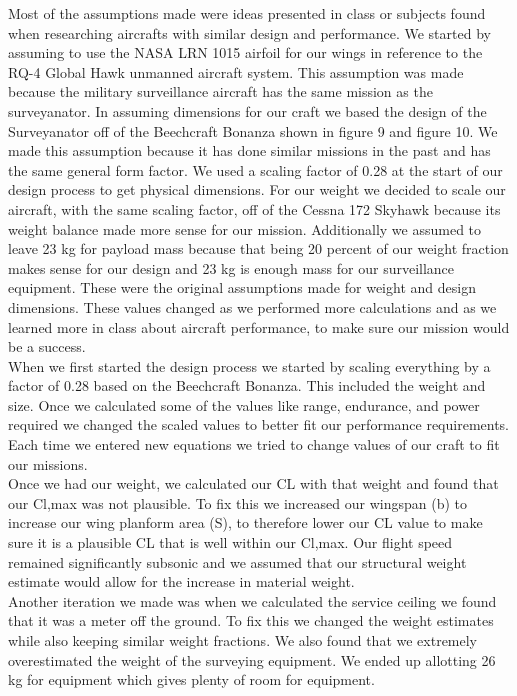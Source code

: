 \documentclass[12pt,A4paper]{article}
\begin{document}
	\hspace{.15 in} Most of the assumptions made were ideas presented in class or subjects found when researching aircrafts with similar design and performance. We started by assuming to use the NASA LRN 1015 airfoil for our wings in reference to the RQ-4 Global Hawk unmanned aircraft system. This assumption was made because the military surveillance aircraft has the same mission as the surveyanator. In assuming dimensions for our craft we based the design of the Surveyanator off of the Beechcraft Bonanza shown in figure 9 and figure 10. We made this assumption because it has done similar missions in the past and has the same general form factor. We used a scaling factor of 0.28 at the start of our design process to get physical dimensions. For our weight we decided to scale our aircraft, with the same scaling factor, off of the Cessna 172 Skyhawk because its weight balance made more sense for our mission. Additionally we assumed to leave 23 kg for payload mass because that being 20 percent of our weight fraction makes   sense for our design and 23 kg is enough mass for our surveillance equipment. These were the original assumptions made for weight and design dimensions. These values changed as we performed more calculations and as we learned more in class about aircraft performance, to make sure our mission would be a success. \\
	\indent When we first started the design process we started by scaling everything by a factor of 0.28 based on the Beechcraft Bonanza. This included the weight and size. Once we calculated some of the values like range, endurance, and power required we changed the scaled values to better fit our performance requirements. Each time we entered new equations we tried to change values of our craft to fit our missions. \\
	\indent Once we had our weight, we calculated our CL with that weight and found that our Cl,max was not plausible. To fix this we increased our wingspan (b) to increase our wing planform area (S), to therefore lower our CL value to make sure it is a plausible CL that is well within our Cl,max. Our flight speed remained significantly subsonic and we assumed that our structural weight estimate would allow for the increase in material weight. \\
	\indent Another iteration we made was when we calculated the service ceiling we found that it was a meter off the ground. To fix this we changed the weight estimates while also keeping similar weight fractions. We also found that we extremely overestimated the weight of the surveying equipment. We ended up allotting 26 kg for equipment which gives plenty of room for equipment. \\
\end{document}
